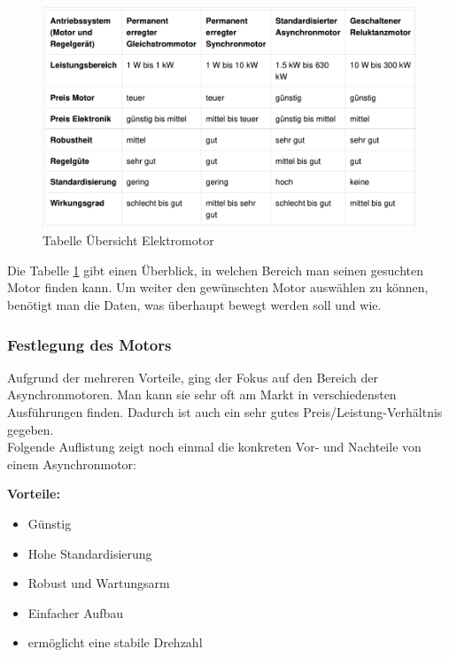 \begin{figure}[H]
\begin{center}
	\includegraphics[width=1\textwidth]{fig/TabelleMotor}
	\caption{Tabelle Übersicht Elektromotor \label{fig:ueberschichtElektromotor}}
\end{center}
\end{figure}

Die Tabelle \ref{fig:ueberschichtElektromotor} gibt einen Überblick, in welchen Bereich man seinen gesuchten Motor finden kann. 
Um weiter den gewünschten Motor auswählen zu können, benötigt man die Daten, was überhaupt bewegt werden soll und wie. 

\subsubsection{Festlegung des Motors}
\label{sec:festlegungDesMotors}

Aufgrund der mehreren Vorteile, ging der Fokus auf den Bereich der Asynchronmotoren. Man kann sie sehr oft am Markt in verschiedensten Ausführungen finden. Dadurch ist auch ein sehr gutes Preis/Leistung-Verhältnis gegeben. 
\\
Folgende Auflistung zeigt noch einmal die konkreten Vor- und Nachteile von einem Asynchronmotor:


\textbf{Vorteile:}

\begin{itemize}
	\item{Günstig}
	\item{Hohe Standardisierung}
	\item{Robust und Wartungsarm}
	\item{Einfacher Aufbau}
	\item{ermöglicht eine stabile Drehzahl}
\end{itemize}

